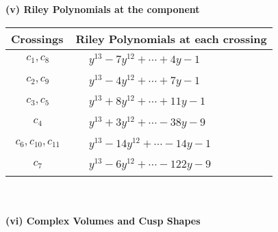\documentclass[1p]{elsarticle_modified}
\theoremstyle{definition}
\begin{document}
\newpage\renewcommand{\arraystretch}{1}
\flushleft \textbf{(v) Riley Polynomials at the component}\newline \\
\begin{tabular}{m{50pt}|m{274pt}}
Crossings & \hspace{64pt}Riley Polynomials at each crossing \\
\hline $$\begin{aligned}c_{1},c_{8}\end{aligned}$$&$\begin{aligned}
&y^{13}-7 y^{12}+\cdots+4 y-1
\end{aligned}$\\
\hline $$\begin{aligned}c_{2},c_{9}\end{aligned}$$&$\begin{aligned}
&y^{13}-4 y^{12}+\cdots+7 y-1
\end{aligned}$\\
\hline $$\begin{aligned}c_{3},c_{5}\end{aligned}$$&$\begin{aligned}
&y^{13}+8 y^{12}+\cdots+11 y-1
\end{aligned}$\\
\hline $$\begin{aligned}c_{4}\end{aligned}$$&$\begin{aligned}
&y^{13}+3 y^{12}+\cdots-38 y-9
\end{aligned}$\\
\hline $$\begin{aligned}c_{6},c_{10},c_{11}\end{aligned}$$&$\begin{aligned}
&y^{13}-14 y^{12}+\cdots-14 y-1
\end{aligned}$\\
\hline $$\begin{aligned}c_{7}\end{aligned}$$&$\begin{aligned}
&y^{13}-6 y^{12}+\cdots-122 y-9
\end{aligned}$\\
\hline
\end{tabular}\\~\\
\newpage\flushleft \textbf{(vi) Complex Volumes and Cusp Shapes}
\end{document}

